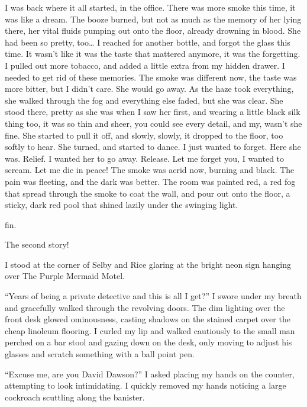 I was back where it all started, in the office. There was more
smoke this time, it was like a dream. The booze burned, but not as
much as the memory of her lying there, her vital fluids pumping out
onto the floor, already drowning in blood. She had been so pretty,
too{\ldots} I reached for another bottle, and forgot the glass this
time. It wasn't like it was the taste that mattered anymore, it was
the forgetting. I pulled out more tobacco, and added a little extra
from my hidden drawer. I needed to get rid of these memories. The
smoke was different now, the taste was more bitter, but I didn't
care. She would go away. As the haze took everything, she walked
through the fog and everything else faded, but she was clear. She
stood there, pretty as she was when I saw her first, and wearing a
little black silk thing too, it was so thin and sheer, you could
see every detail, and my, wasn't she fine. She started to pull it
off, and slowly, slowly, it dropped to the floor, too softly to
hear. She turned, and started to dance. I just wanted to forget.
Here she was. Relief. I wanted her to go away. Release. Let me
forget you, I wanted to scream. Let me die in peace! The smoke was
acrid now, burning and black. The pain was fleeting, and the dark
was better. The room was painted red, a red fog that spread through
the smoke to coat the wall, and pour out onto the floor, a sticky,
dark red pool that shined lazily under the swinging light.

fin.





The second story!





I stood at the corner of Selby and Rice glaring at the bright neon
sign hanging over The Purple Mermaid Motel.

``Years of being a private detective and this is all I
get?'' I swore under my breath and gracefully walked through
the revolving doors. The dim lighting over the front desk glowed
ominousness, casting shadows on the stained carpet over the cheap
linoleum flooring. I curled my lip and walked cautiously to the
small man perched on a bar stool and gazing down on the desk, only
moving to adjust his glasses and scratch something with a ball
point pen.

``Excuse me, are you David Dawson?'' I asked placing my
hands on the counter, attempting to look intimidating. I quickly
removed my hands noticing a large cockroach scuttling along the
banister.


